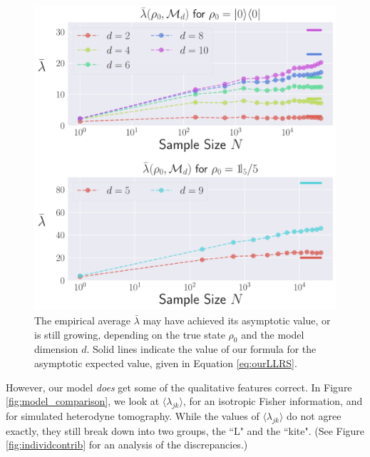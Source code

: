 \documentclass[aps,pra, twocolumn]{revtex4-1}
\begin{document}
\begin{figure}
  \includegraphics[width=\columnwidth]{Images/Figure_9.pdf}
 \caption{The empirical average $\bar{\lambda}$  may have achieved its asymptotic value, or is still 
growing, depending on the true state $\rho_{0}$ and the model dimension $d$. Solid lines indicate the value of our formula
for the asymptotic expected value, given in Equation \eqref{eq:ourLLRS}.}
\label{fig:totalcontrib}
\end{figure}


However, our model \emph{does} get some of the qualitative features correct. In Figure \ref{fig:model_comparison}, we look at $\langle \lambda_{jk}\rangle$, for an isotropic Fisher information, and for simulated heterodyne tomography. While the values of $\langle \lambda_{jk} \rangle$ do not agree exactly, they still break down into two groups, the ``L" and the ``kite". (See Figure \ref{fig:individcontrib} for an analysis of the discrepancies.)
 
\end{document}
